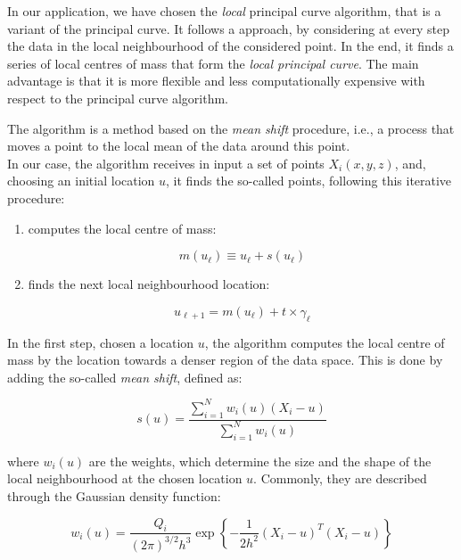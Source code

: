 In our application, we have chosen the \textit{local} principal curve algorithm, that is a variant of the principal curve.
It follows a  approach, by considering at every step the data in the local neighbourhood of the considered point. In the end, it finds a series of local centres of mass that form the \textit{local principal curve}. The main advantage is that it is more flexible and less computationally expensive \cite{lpc-definition} with respect to the principal curve algorithm.

The \lpc algorithm \cite{LPC-algo} is a method based on the \textit{mean shift} procedure, i.e., a process that moves a point to the local mean of the data around this point. \\In our case, the algorithm receives in input a set of points $X_i (x,y,z)$, and, choosing an initial location $u$, it finds the so-called \lpc points, following this iterative procedure:
\begin{enumerate}
    \item computes the local centre of mass: 
    
    \begin{equation}
        m\left(u_{\ell}\right) \equiv u_{\ell}+s\left(u_{\ell}\right)
    \end{equation}
    
    \item finds the next local neighbourhood location: 
    
    \begin{equation}
        u_{\ell+1} = m(u_\ell) + t \times \gamma_\ell
    \label{2-step}
    \end{equation}
    
\end{enumerate}

In the first step, chosen a location $u$, the algorithm computes the local centre of mass by  the location towards a denser region of the data space. This is done by adding the so-called \textit{mean shift}, defined as: 

\begin{equation}
    s(u) = \frac{\sum^N_{i=1}w_i(u)(X_i - u)}{\sum^N_{i=1}w_i(u)}
\end{equation}

where $w_i(u)$ are the weights, which determine the size and the shape of the local neighbourhood at the chosen location $u$. Commonly, they are described through the Gaussian density function:

\begin{equation}
    w_i(u)=\frac{Q_i}{(2 \pi)^{3 / 2} h^3} \exp \left\{-\frac{1}{2 h^2}\left(X_i-u\right)^T\left(X_i-u\right)\right\}
\end{equation}

